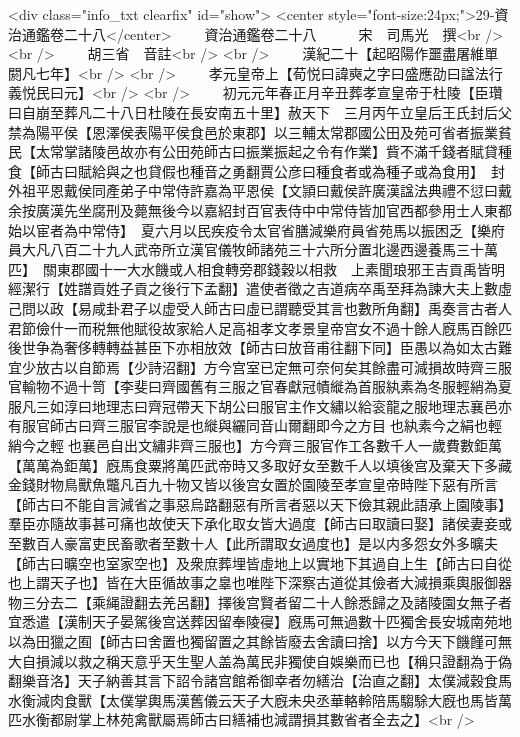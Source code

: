 <div class="info_txt clearfix" id="show">
<center style="font-size:24px;">29-資治通鑑卷二十八</center>
  　　資治通鑑卷二十八　　　宋　司馬光　撰<br />
<br />
　　胡三省　音註<br />
<br />
　　漢紀二十【起昭陽作噩盡屠維單閼凡七年】<br />
<br />
　　孝元皇帝上【荀悦曰諱奭之字曰盛應劭曰諡法行義悦民曰元】<br />
<br />
　　初元元年春正月辛丑葬孝宣皇帝于杜陵【臣瓚曰自崩至葬凡二十八日杜陵在長安南五十里】赦天下　三月丙午立皇后王氏封后父禁為陽平侯【恩澤侯表陽平侯食邑於東郡】以三輔太常郡國公田及苑可省者振業貧民【太常掌諸陵邑故亦有公田苑師古曰振業振起之令有作業】貲不滿千錢者賦貸種食【師古曰賦給與之也貸假也種音之勇翻賈公彦曰種食者或為種子或為食用】　封外祖平恩戴侯同產弟子中常侍許嘉為平恩侯【文頴曰戴侯許廣漢諡法典禮不愆曰戴余按廣漢先坐腐刑及薨無後今以嘉紹封百官表侍中中常侍皆加官西都參用士人東都始以宦者為中常侍】　夏六月以民疾疫令太官省膳減樂府員省苑馬以振困乏【樂府員大凡八百二十九人武帝所立漢官儀牧師諸苑三十六所分置北邊西邊養馬三十萬匹】　關東郡國十一大水饑或人相食轉旁郡錢穀以相救　上素聞琅邪王吉貢禹皆明經潔行【姓譜貢姓子貢之後行下孟翻】遣使者徵之吉道病卒禹至拜為諫大夫上數虛己問以政【易咸卦君子以虚受人師古曰虛已謂聽受其言也數所角翻】禹奏言古者人君節儉什一而税無他賦役故家給人足高祖孝文孝景皇帝宫女不過十餘人廐馬百餘匹後世争為奢侈轉轉益甚臣下亦相放效【師古曰放音甫往翻下同】臣愚以為如太古難宜少放古以自節焉【少詩沼翻】方今宫室已定無可奈何矣其餘盡可減損故時齊三服官輸物不過十笥【李斐曰齊國舊有三服之官春獻冠幘縰為首服紈素為冬服輕綃為夏服凡三如淳曰地理志曰齊冠帶天下胡公曰服官主作文繡以給衮龍之服地理志襄邑亦有服官師古曰齊三服官李說是也縰與纚同音山爾翻即今之方目也紈素今之絹也輕綃今之輕也襄邑自出文繡非齊三服也】方今齊三服官作工各數千人一歲費數鉅萬【萬萬為鉅萬】廐馬食粟將萬匹武帝時又多取好女至數千人以填後宫及棄天下多藏金錢財物鳥獸魚鼈凡百九十物又皆以後宫女置於園陵至孝宣皇帝時陛下惡有所言【師古曰不能自言減省之事惡烏路翻惡有所言者惡以天下儉其親此語承上園陵事】羣臣亦隨故事甚可痛也故使天下承化取女皆大過度【師古曰取讀曰娶】諸侯妻妾或至數百人豪富吏民畜歌者至數十人【此所謂取女過度也】是以内多怨女外多曠夫【師古曰曠空也室家空也】及衆庶葬埋皆虛地上以實地下其過自上生【師古曰自從也上謂天子也】皆在大臣循故事之辠也唯陛下深察古道從其儉者大減損乘輿服御器物三分去二【乘䋲證翻去羌呂翻】擇後宫賢者留二十人餘悉歸之及諸陵園女無子者宜悉遣【漢制天子晏駕後宫送葬因留奉陵寑】廐馬可無過數十匹獨舍長安城南苑地以為田獵之囿【師古曰舍置也獨留置之其餘皆廢去舍讀曰捨】以方今天下饑饉可無大自損減以救之稱天意乎天生聖人盖為萬民非獨使自娛樂而已也【稱只證翻為于偽翻樂音洛】天子納善其言下詔令諸宫館希御幸者勿繕治【治直之翻】太僕減穀食馬水衡減肉食獸【太僕掌輿馬漢舊儀云天子大廐未央丞華輅軨陪馬騶駼大廐也馬皆萬匹水衡都尉掌上林苑禽獸屬焉師古曰繕補也減謂損其數省者全去之】<br />
